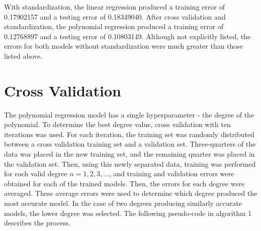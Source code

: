 \documentclass[12pt]{article}
\begin{document}
    With standardization, the linear regression produced a training error of 0.17902157 and a testing error of 0.18349040. After cross validation and standardization, the polynomial regression produced a training error of 0.12768897 and a testing error of 0.10803149. Although not explicitly listed, the errors for both models without standardization were much greater than those listed above.
	
	\section{Cross Validation} \label{cross validation}
	
	The polynomial regression model has a single hyperparameter - the degree of the polynomial. To determine the best degree value, cross validation with ten iterations was used. For each iteration, the training set was randomly distributed between a cross validation training set and a validation set. Three-quarters of the data was placed in the new training set, and the remaining quarter was placed in the validation set. Then, using this newly separated data, training was performed for each valid degree $n = 1, 2, 3, ...$, and training and validation errors were obtained for each of the trained models. Then, the errors for each degree were averaged. These average errors were used to determine which degree produced the most accurate model. In the case of two degrees producing similarly accurate models, the lower degree was selected. The following pseudo-code in algorithm 1 describes the process.
\end{document}
